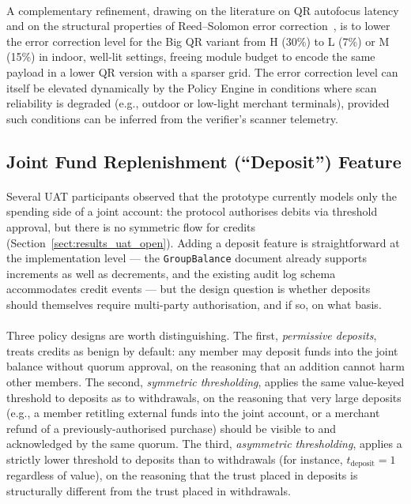 \paragraph{}A complementary refinement, drawing on the literature on QR autofocus latency~\cite{corpuz2025} and on the structural properties of Reed--Solomon error correction~\cite{reed1960, bajaj2024}, is to lower the error correction level for the Big QR variant from H (30\%) to L (7\%) or M (15\%) in indoor, well-lit settings, freeing module budget to encode the same payload in a lower QR version with a sparser grid. The error correction level can itself be elevated dynamically by the Policy Engine in conditions where scan reliability is degraded (e.g., outdoor or low-light merchant terminals), provided such conditions can be inferred from the verifier's scanner telemetry.

\subsection{Joint Fund Replenishment (``Deposit'') Feature}
\label{sect:rec_deposit}

\paragraph{}Several UAT participants observed that the prototype currently models only the spending side of a joint account: the protocol authorises debits via threshold approval, but there is no symmetric flow for credits (Section~\ref{sect:results_uat_open}). Adding a deposit feature is straightforward at the implementation level --- the \texttt{GroupBalance} document already supports increments as well as decrements, and the existing audit log schema accommodates credit events --- but the design question is whether deposits should themselves require multi-party authorisation, and if so, on what basis.

\paragraph{}Three policy designs are worth distinguishing. The first, \textit{permissive deposits}, treats credits as benign by default: any member may deposit funds into the joint balance without quorum approval, on the reasoning that an addition cannot harm other members. The second, \textit{symmetric thresholding}, applies the same value-keyed threshold to deposits as to withdrawals, on the reasoning that very large deposits (e.g., a member retitling external funds into the joint account, or a merchant refund of a previously-authorised purchase) should be visible to and acknowledged by the same quorum. The third, \textit{asymmetric thresholding}, applies a strictly lower threshold to deposits than to withdrawals (for instance, $t_{\text{deposit}} = 1$ regardless of value), on the reasoning that the trust placed in deposits is structurally different from the trust placed in withdrawals.

